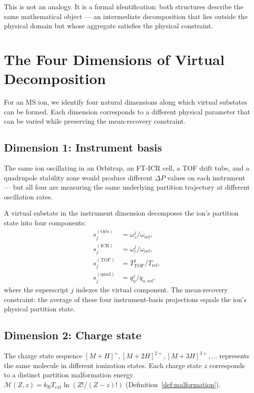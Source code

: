 \documentclass[twocolumn,10pt,a4paper]{article}
\theoremstyle{thmstyle}
\theoremstyle{definition}
\theoremstyle{remark}
\newcommand{\kB}{k_{\mathrm{B}}}
\newcommand{\Mop}{\mathcal{M}}
\newcommand{\dP}{\Delta P}
\newcommand{\Tcat}{T_{\mathrm{cat}}}
\begin{document}
This is not an analogy. It is a formal identification: both structures
describe the same mathematical object --- an intermediate decomposition
that lies outside the physical domain but whose aggregate satisfies the
physical constraint.

\section{The Four Dimensions of Virtual Decomposition}
\label{sec:stacking}

For an MS ion, we identify four natural dimensions along which virtual
substates can be formed. Each dimension corresponds to a different
physical parameter that can be varied while preserving the mean-recovery
constraint.

\subsection{Dimension 1: Instrument basis}

The same ion oscillating in an Orbitrap, an FT-ICR cell, a TOF drift
tube, and a quadrupole stability zone would produce different $\dP$
values on each instrument --- but all four are measuring the same
underlying partition trajectory at different oscillation rates.

A virtual substate in the instrument dimension decomposes the ion's
partition state into four components:
\begin{align}
s^{(\mathrm{Orb})}_{j} &= \omega_z^j/\omega_{\text{ref}}, \\
s^{(\mathrm{ICR})}_{j} &= \omega_c^j/\omega_{\text{ref}}, \\
s^{(\mathrm{TOF})}_{j} &= T^j_{\mathrm{TOF}}/T_{\text{ref}}, \\
s^{(\mathrm{quad})}_{j} &= q_u^j/q_{u,\text{ref}},
\end{align}
where the superscript $j$ indexes the virtual component.
The mean-recovery constraint: the average of these four
instrument-basis projections equals the ion's physical partition state.

\subsection{Dimension 2: Charge state}

The charge state sequence $[M+H]^+, [M+2H]^{2+}, [M+3H]^{3+}, \ldots$
represents the same molecule in different ionization states. Each charge
state $z$ corresponds to a distinct partition malformation energy
$\Mop(Z, z) = \kB\Tcat\ln(Z!/(Z-z)!)$ (Definition~\ref{def:malformation}).
\end{document}
